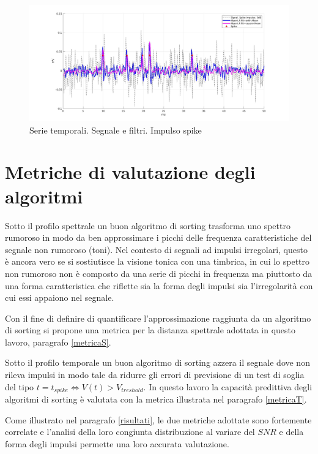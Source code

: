 \documentclass[9pt,twocolumn,twoside]{osajnl}
\begin{document}
\begin{figure}[htbp]
\centering
\includegraphics[width=1\linewidth]{results/c1_I4SNR0time.jpg}
\caption{Serie temporali. Segnale e filtri. Impulso spike}
\label{fig:c1_I4SNR0time}
\end{figure}




\section{Metriche di valutazione degli algoritmi}

Sotto il profilo spettrale un buon algoritmo di sorting trasforma uno spettro rumoroso in modo da ben approssimare i picchi delle frequenza caratteristiche del segnale non rumoroso (toni). Nel contesto di segnali ad impulsi irregolari, questo è ancora vero se si sostiutisce la visione tonica con una timbrica, in cui lo spettro non rumoroso non è composto da una serie di picchi in frequenza ma piuttosto da una forma caratteristica che riflette sia la forma degli impulsi sia l'irregolarità con cui essi appaiono nel segnale.

Con il fine di definire di quantificare l'approssimazione raggiunta da un algoritmo di sorting si propone una metrica per la distanza spettrale adottata in questo lavoro, paragrafo \ref{metricaS}.

Sotto il profilo temporale un buon algoritmo di sorting azzera il segnale dove non rileva impulsi in modo tale da ridurre gli errori di previsione di un test di soglia del tipo
$t = t_{spike} \Leftrightarrow V(t) > V_{treshold}$. In questo lavoro la capacità predittiva degli algoritmi di sorting è valutata con la metrica illustrata nel paragrafo \ref{metricaT}.

Come illustrato nel paragrafo \ref{risultati}, le due metriche adottate sono fortemente correlate e l'analisi della loro congiunta distribuzione al variare del $SNR$ e della forma degli impulsi permette una loro accurata valutazione.
\end{document}

